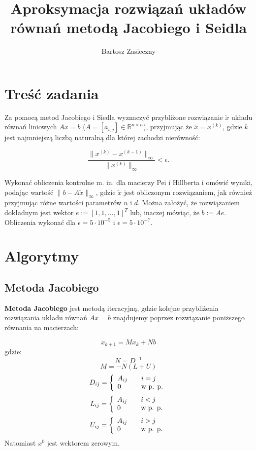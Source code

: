 \documentclass[a4paper,11pt]{article}
\title{Aproksymacja rozwiązań układów równań metodą Jacobiego i Seidla}
\author{Bartosz Zasieczny}
\newcommand{\norm}[1]{\lVert#1\rVert}
\begin{document}
\maketitle
\tableofcontents

\section{Treść zadania}

Za pomocą metod Jacobiego i Siedla wyznaczyć przybliżone rozwiązanie $ \tilde{x} $ 
układu równań liniowych $ Ax = b $ ($ A = [a_{i,j}] \in \mathbb{R}^{n \times n} $), 
przyjmując że $ \tilde{x} = x^{(k)} $, gdzie $ k $ jest najmniejszą liczbą naturalną 
dla której zachodzi nierówność:

$$ \frac{\norm{ x^{(k)} - x^{(k-1)}}_{\infty}}{\norm{x^{(k)}}_{\infty}} < \epsilon. $$

Wykonać obliczenia kontrolne m. in. dla macierzy Pei i Hillberta i omówić wyniki, 
podając wartość $ \norm{b - A \tilde{x}}_{\infty} $, gdzie $ \tilde{x} $ jest 
obliczonym rozwiązaniem, jak również przyjmując różne wartości parametrów $n$ i $d$. 
Można założyć, że rozwiązaniem dokładnym jest wektor $ e := [1,1,...,1]^T $ lub, 
inaczej mówiąc, że $ b := Ae $. Obliczenia wykonać dla $ \epsilon = 5 \cdot 10^{-5} $ i $ \epsilon = 5 \cdot 10^{-7} $.

\section{Algorytmy}
\subsection{Metoda Jacobiego}
  \textbf{Metoda Jacobiego} jest metodą iteracyjną, gdzie kolejne przybliżenia 
  rozwiązania układu równań $ Ax = b $ znajdujemy poprzez rozwiązanie poniższego 
  równania na macierzach:
  
  $$ x_{k+1} = Mx_k + Nb $$
  gdzie:
  $$ N = D^{-1} $$
  $$ M = -N(L+U) $$
  $$ 
  D_{ij} =  \left\{\begin{array}{l l}
        A_{ij} & \quad i=j \\
        0 & \quad \textrm{w p. p.}
        \end{array}\right.
  $$
  $$
  L_{ij} =  \left\{\begin{array}{l l}
        A_{ij} & \quad i < j \\
        0 & \quad \textrm{w p. p.}
        \end{array}\right.
  $$
  $$
  U_{ij} = \left\{\begin{array}{l l}
        A_{ij} & \quad i > j \\
        0 & \quad \textrm{w p. p.}
        \end{array}\right.
  $$
  Natomiast $ x^0 $ jest wektorem zerowym.
  
\end{document}

